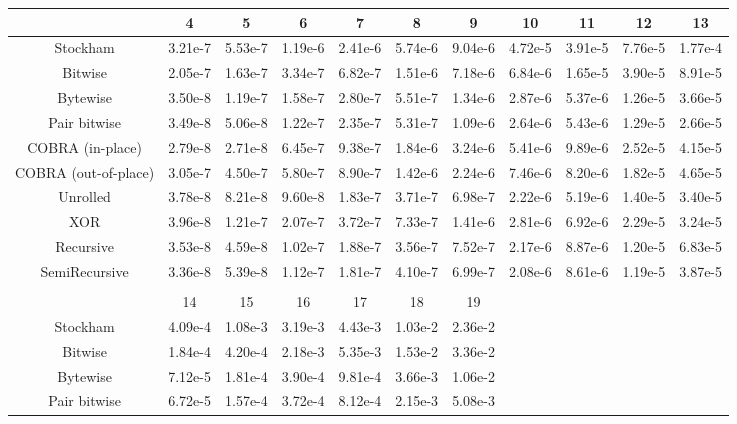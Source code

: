 \begin{tabular}{c|cccccccccc}{} &       4  &       5  &       6  &       7  &       8  &       9  &       10 &       11 &       12 &       13 \\
\midrule
Stockham             &  3.21e-7 &  5.53e-7 &  1.19e-6 &  2.41e-6 &  5.74e-6 &  9.04e-6 &  4.72e-5 &  3.91e-5 &  7.76e-5 &  1.77e-4 \\
Bitwise              &  2.05e-7 &  1.63e-7 &  3.34e-7 &  6.82e-7 &  1.51e-6 &  7.18e-6 &  6.84e-6 &  1.65e-5 &  3.90e-5 &  8.91e-5 \\
Bytewise             &  3.50e-8 &  1.19e-7 &  1.58e-7 &  2.80e-7 &  5.51e-7 &  1.34e-6 &  2.87e-6 &  5.37e-6 &  1.26e-5 &  3.66e-5 \\
Pair bitwise         &  3.49e-8 &  5.06e-8 &  1.22e-7 &  2.35e-7 &  5.31e-7 &  1.09e-6 &  2.64e-6 &  5.43e-6 &  1.29e-5 &  2.66e-5 \\
COBRA (in-place)     &  2.79e-8 &  2.71e-8 &  6.45e-7 &  9.38e-7 &  1.84e-6 &  3.24e-6 &  5.41e-6 &  9.89e-6 &  2.52e-5 &  4.15e-5 \\
COBRA (out-of-place) &  3.05e-7 &  4.50e-7 &  5.80e-7 &  8.90e-7 &  1.42e-6 &  2.24e-6 &  7.46e-6 &  8.20e-6 &  1.82e-5 &  4.65e-5 \\
Unrolled             &  3.78e-8 &  8.21e-8 &  9.60e-8 &  1.83e-7 &  3.71e-7 &  6.98e-7 &  2.22e-6 &  5.19e-6 &  1.40e-5 &  3.40e-5 \\
XOR                  &  3.96e-8 &  1.21e-7 &  2.07e-7 &  3.72e-7 &  7.33e-7 &  1.41e-6 &  2.81e-6 &  6.92e-6 &  2.29e-5 &  3.24e-5 \\
Recursive            &  3.53e-8 &  4.59e-8 &  1.02e-7 &  1.88e-7 &  3.56e-7 &  7.52e-7 &  2.17e-6 &  8.87e-6 &  1.20e-5 &  6.83e-5 \\
SemiRecursive        &  3.36e-8 &  5.39e-8 &  1.12e-7 &  1.81e-7 &  4.10e-7 &  6.99e-7 &  2.08e-6 &  8.61e-6 &  1.19e-5 &  3.87e-5 \\
\vspace{.5cm}\\{} &       14 &       15 &       16 &       17 &       18 &       19 \\
\midrule
Stockham             &  4.09e-4 &  1.08e-3 &  3.19e-3 &  4.43e-3 &  1.03e-2 &  2.36e-2 \\
Bitwise              &  1.84e-4 &  4.20e-4 &  2.18e-3 &  5.35e-3 &  1.53e-2 &  3.36e-2 \\
Bytewise             &  7.12e-5 &  1.81e-4 &  3.90e-4 &  9.81e-4 &  3.66e-3 &  1.06e-2 \\
Pair bitwise         &  6.72e-5 &  1.57e-4 &  3.72e-4 &  8.12e-4 &  2.15e-3 &  5.08e-3 \\

\end{tabular}
